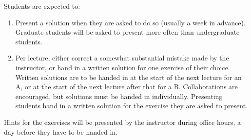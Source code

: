 Students are expected to:
\begin{enumerate}
\item Present a solution when they are asked to do so (usually a week in advance). Graduate students will be asked to present more often than undergraduate students.
\item Per lecture, either correct a somewhat substantial mistake made by the instructor, or hand in a written solution for one exercise of their choice. Written solutions are to be handed in at the start of the next lecture for an A, or at the start of the next lecture after that for a B. Collaborations are encouraged, but solutions must be handed in individually. Presenting students hand in a written solution for the exercise they are asked to present.
\end{enumerate}

Hints for the exercises will be presented by the instructor during office hours, a day before they have to be handed in. 
